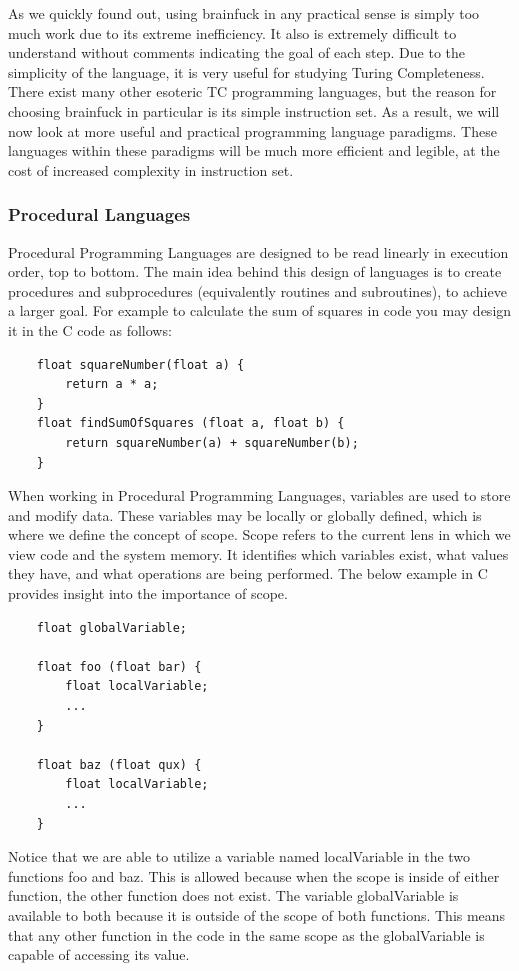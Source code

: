 As we quickly found out, using brainfuck in any practical sense is simply too much work due to its extreme inefficiency.
It also is extremely difficult to understand without comments indicating the goal of each step.
Due to the simplicity of the language, it is very useful for studying Turing Completeness.
There exist many other esoteric TC programming languages, but the reason for choosing brainfuck in particular is its simple instruction set.
As a result, we will now look at more useful and practical programming language paradigms.
These languages within these paradigms will be much more efficient and legible, at the cost of increased complexity in instruction set.

\subsubsection{Procedural Languages}\label{subsubsec:PL}

Procedural Programming Languages are designed to be read linearly in execution order, top to bottom.
The main idea behind this design of languages is to create procedures and subprocedures (equivalently routines and subroutines), to achieve a larger goal.
For example to calculate the sum of squares in code you may design it in the C code as follows:

\begin{verbatim}
    float squareNumber(float a) {
        return a * a;
    }
    float findSumOfSquares (float a, float b) {
        return squareNumber(a) + squareNumber(b);
    }
\end{verbatim}
    
When working in Procedural Programming Languages, variables are used to store and modify data.
These variables may be locally or globally defined, which is where we define the concept of scope.
Scope refers to the current lens in which we view code and the system memory.
It identifies which variables exist, what values they have, and what operations are being performed.
The below example in C provides insight into the importance of scope.

\begin{verbatim}
    float globalVariable;

    float foo (float bar) {
        float localVariable;
        ...
    }

    float baz (float qux) {
        float localVariable;
        ...
    }
\end{verbatim}

Notice that we are able to utilize a variable named localVariable in the two functions foo and baz.
This is allowed because when the scope is inside of either function, the other function does not exist.
The variable globalVariable is available to both because it is outside of the scope of both functions.
This means that any other function in the code in the same scope as the globalVariable is capable of accessing its value.

